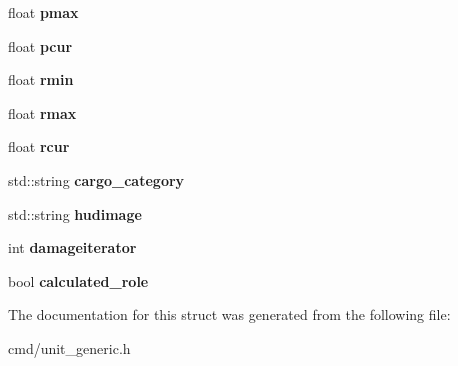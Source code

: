 \begin{DoxyCompactItemize}
\item 
float {\bfseries pmax}\hypertarget{structUnit_1_1XML_a23b00218a3303321849257e4878ee82f}{}\label{structUnit_1_1XML_a23b00218a3303321849257e4878ee82f}

\item 
float {\bfseries pcur}\hypertarget{structUnit_1_1XML_a8e3a3e16fa13e6764eeff244710d36eb}{}\label{structUnit_1_1XML_a8e3a3e16fa13e6764eeff244710d36eb}

\item 
float {\bfseries rmin}\hypertarget{structUnit_1_1XML_a15c50c0c7236b7f79d24a458d70525b2}{}\label{structUnit_1_1XML_a15c50c0c7236b7f79d24a458d70525b2}

\item 
float {\bfseries rmax}\hypertarget{structUnit_1_1XML_a9d894ef90f61af50fbdcda1db9c73c83}{}\label{structUnit_1_1XML_a9d894ef90f61af50fbdcda1db9c73c83}

\item 
float {\bfseries rcur}\hypertarget{structUnit_1_1XML_a10767e6c0fecb76d8178eed2fe466c57}{}\label{structUnit_1_1XML_a10767e6c0fecb76d8178eed2fe466c57}

\item 
std\+::string {\bfseries cargo\+\_\+category}\hypertarget{structUnit_1_1XML_aa63c99f960c3e1bce3a25c8607f9b25e}{}\label{structUnit_1_1XML_aa63c99f960c3e1bce3a25c8607f9b25e}

\item 
std\+::string {\bfseries hudimage}\hypertarget{structUnit_1_1XML_ada0f11ca97d2986b29c9a0f65c4391a4}{}\label{structUnit_1_1XML_ada0f11ca97d2986b29c9a0f65c4391a4}

\item 
int {\bfseries damageiterator}\hypertarget{structUnit_1_1XML_a2dfbcf10d4511f7fce5a8d6bfc6b19b0}{}\label{structUnit_1_1XML_a2dfbcf10d4511f7fce5a8d6bfc6b19b0}

\item 
bool {\bfseries calculated\+\_\+role}\hypertarget{structUnit_1_1XML_a2f350650d5be9ea5d4d15dbb00d52982}{}\label{structUnit_1_1XML_a2f350650d5be9ea5d4d15dbb00d52982}

\end{DoxyCompactItemize}


The documentation for this struct was generated from the following file\+:\begin{DoxyCompactItemize}
\item 
cmd/unit\+\_\+generic.\+h\end{DoxyCompactItemize}

